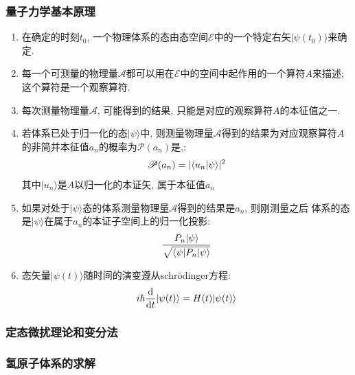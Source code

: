 \documentclass[a4paper, 11pt]{article}
\begin{document}
\begin{spacing}{1.2}
        \subsubsection{量子力学基本原理}
          \begin{enumerate}[1.]
            \item 在确定的时刻\(t_0\), 一个物理体系的态由态空间$\mathscr{E}$中的一个特定右矢$|\psi(t_0)\rangle$来确定.
            \item 每一个可测量的物理量$\mathscr{A}$都可以用在$\mathscr{E}$中的空间中起作用的一个算符$A$来描述;
                  这个算符是一个观察算符.
            \item 每次测量物理量$\mathscr{A}$, 可能得到的结果, 只能是对应的观察算符$A$的本征值之一.
            \item 若体系已处于归一化的态$|\psi\rangle$中, 则测量物理量$\mathscr{A}$得到的结果为对应观察算符$A$
                  的非简并本征值$a_n$的概率为$\mathscr{P}(a_n)$是,: 
                    \begin{equation}
                      \mathscr{P}(a_n) = |\langle{}u_n|\psi\rangle|^2  \notag     
                    \end{equation}
                    其中$|u_n\rangle$是$A$以归一化的本证矢, 属于本征值$a_n$
            \item 如果对处于$|\psi\rangle$态的体系测量物理量$\mathscr{A}$得到的结果是$a_n$, 则刚测量之后
                  体系的态是$|\psi\rangle$在属于$a_n$的本证子空间上的归一化投影:
                    \begin{equation}
                      \dfrac{P_n|\psi\rangle}{\sqrt{\langle\psi|P_n|\psi\rangle}} \notag
                    \end{equation}
            \item 态矢量$|\psi(t)\rangle$随时间的演变遵从schr\"odinger方程:
                    \begin{equation}
                      i\hbar\dfrac{\mathrm{d}}{\mathrm{d}t}|\psi(t)\rangle = H(t)|\psi(t)\rangle \notag
                    \end{equation}
          \end{enumerate}
        \subsubsection{定态微扰理论和变分法}
        \subsubsection{氢原子体系的求解} 


\end{spacing}
\end{document}
